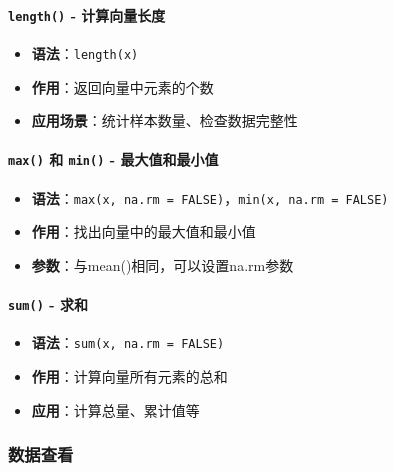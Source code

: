 \documentclass[
  twoside]{book}
\providecommand{\tightlist}{%
  \setlength{\itemsep}{0pt}\setlength{\parskip}{0pt}}
\begin{document}
\hypertarget{length---ux8ba1ux7b97ux5411ux91cfux957fux5ea6}{%
\paragraph{\texorpdfstring{\texttt{length()} - 计算向量长度}{length() - 计算向量长度}}\label{length---ux8ba1ux7b97ux5411ux91cfux957fux5ea6}}

\begin{itemize}
\tightlist
\item
  \textbf{语法}：\texttt{length(x)}
\item
  \textbf{作用}：返回向量中元素的个数
\item
  \textbf{应用场景}：统计样本数量、检查数据完整性
\end{itemize}

\hypertarget{max-ux548c-min---ux6700ux5927ux503cux548cux6700ux5c0fux503c}{%
\paragraph{\texorpdfstring{\texttt{max()} 和 \texttt{min()} - 最大值和最小值}{max() 和 min() - 最大值和最小值}}\label{max-ux548c-min---ux6700ux5927ux503cux548cux6700ux5c0fux503c}}

\begin{itemize}
\tightlist
\item
  \textbf{语法}：\texttt{max(x,\ na.rm\ =\ FALSE)}，\texttt{min(x,\ na.rm\ =\ FALSE)}
\item
  \textbf{作用}：找出向量中的最大值和最小值
\item
  \textbf{参数}：与mean()相同，可以设置na.rm参数
\end{itemize}

\hypertarget{sum---ux6c42ux548c}{%
\paragraph{\texorpdfstring{\texttt{sum()} - 求和}{sum() - 求和}}\label{sum---ux6c42ux548c}}

\begin{itemize}
\tightlist
\item
  \textbf{语法}：\texttt{sum(x,\ na.rm\ =\ FALSE)}
\item
  \textbf{作用}：计算向量所有元素的总和
\item
  \textbf{应用}：计算总量、累计值等
\end{itemize}

\hypertarget{ux6570ux636eux67e5ux770b}{%
\subsubsection{数据查看}\label{ux6570ux636eux67e5ux770b}}
\end{document}
